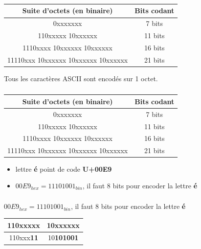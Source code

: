 \documentclass[svgnames,11pt]{beamer}
\begin{document}
\begin{frame}
    \frametitle{}
    \begin{center}
        \begin{tabular}{|c|c|}
        \hline 
        Suite d'octets (en binaire) & Bits codant \\ 
        \hline 
        0xxxxxxx & 7 bits \\ 
        \hline 
        110xxxxx 10xxxxxx & 11 bits \\ 
        \hline 
        1110xxxx 10xxxxxx 10xxxxxx & 16 bits \\ 
        \hline 
        11110xxx 10xxxxxx 10xxxxxx 10xxxxxx & 21 bits \\ 
        \hline 
        \end{tabular}
        \end{center}
    \begin{aretenir}[Remarque]
    Tous les caractères ASCII sont encodés sur 1 octet.
    \end{aretenir}

\end{frame}
\begin{frame}
    \frametitle{}
    \begin{center}
        \begin{tabular}{|c|c|}
        \hline 
        Suite d'octets (en binaire) & Bits codant \\ 
        \hline 
        0xxxxxxx & 7 bits \\ 
        \hline 
        110xxxxx 10xxxxxx & 11 bits \\ 
        \hline 
        1110xxxx 10xxxxxx 10xxxxxx & 16 bits \\ 
        \hline 
        11110xxx 10xxxxxx 10xxxxxx 10xxxxxx & 21 bits \\ 
        \hline 
        \end{tabular}
        \end{center}
\begin{itemize}
    \item<1-> lettre \textbf{é} point de code \textbf{U+00E9}
    \item<2-> $00E9_{hex} = 11101001_{bin}$, il faut 8 bits pour encoder la lettre \textbf{é}
\end{itemize}

\end{frame}
\begin{frame}
    \frametitle{}
\begin{center}
    $00E9_{hex} = 11101001_{bin}$, il faut 8 bits pour encoder la lettre \textbf{é}
\end{center}
    \begin{center}
        \begin{tabular}{|*{2}{c|}}
            \hline
            110xxxxx&10xxxxxx\\
            \hline
110xxx\textbf{11}&10\textbf{101001}\\
\hline
        \end{tabular}
    \end{center}

\end{frame}
\end{document}
